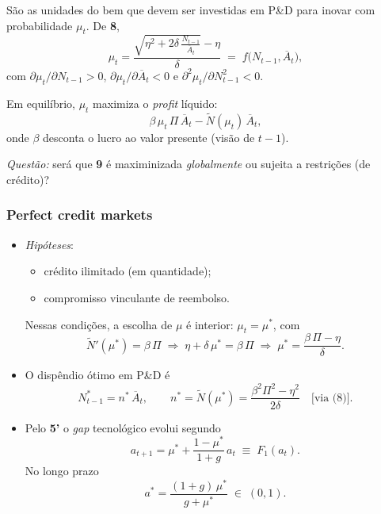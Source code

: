 \documentclass[a4paper,12pt]{article}[abntex2]
\begin{document}
São as unidades do bem que devem ser investidas em P\&D para inovar com probabilidade $\mu_t$.
De \textbf{8},
\[
    \mu_t
      = \frac{\sqrt{\eta^{2}+2\delta\,\tfrac{N_{t-1}}{\overline{A}_t}}-\eta}{\delta}
      \;=\;
      f\!\bigl(N_{t-1},\overline{A}_t\bigr),
\]
com \(\partial\mu_t/\partial N_{t-1}>0\), \(\partial\mu_t/\partial\overline{A}_t<0\) e \(\partial^{2}\mu_t/\partial N_{t-1}^{2}<0\).

Em equilíbrio, $\mu_t$ maximiza o \emph{profit} líquido:
\[
    \beta\,\mu_t\,\Pi\,\overline{A}_t
      -\tilde{N}(\mu_t)\,\overline{A}_t,
    \tag{9}
\]
onde $\beta$ desconta o lucro ao valor presente (visão de $t-1$).

\noindent\emph{Questão:} será que \textbf{9} é maximinizada \textit{globalmente} ou sujeita a restrições (de crédito)?

\subsubsection{\textbf{Perfect credit markets}}
\begin{itemize}
    \item \emph{Hipóteses}:  
          \begin{itemize}
              \item crédito ilimitado (em quantidade);  
              \item compromisso vinculante de reembolso.
          \end{itemize}
          Nessas condições, a escolha de $\mu$ é interior: $\mu_t=\mu^{\ast}$, com
          \[
              \tilde N'(\mu^{\ast})=\beta\,\Pi
              \;\Longrightarrow\;
              \eta+\delta\,\mu^{\ast}= \beta\,\Pi
              \;\Longrightarrow\;
              \boxed{\mu^{\ast}= \dfrac{\beta\,\Pi-\eta}{\delta}}.
          \]
    \item O dispêndio ótimo em P\&D é
          \[
              N_{t-1}^{\ast}= n^{\ast}\,\overline{A}_t,
              \qquad
              n^{\ast}= \tilde N(\mu^{\ast})
                      =\frac{\beta^{2}\Pi^{2}-\eta^{2}}{2\delta}
              \quad\text{[via (8)]}.
          \]
    \item Pelo \textbf{5'} o \emph{gap} tecnológico evolui segundo
          \[
              a_{t+1}= \mu^{\ast}
                      + \frac{1-\mu^{\ast}}{1+g}\,a_t
                      \;\equiv\;F_{1}(a_t). \tag{10}
          \]
          No longo prazo
          \[
              a^{\ast}= \frac{(1+g)\,\mu^{\ast}}{g+\mu^{\ast}}\;\in\;(0,1).
          \]
\end{itemize}
\end{document}
